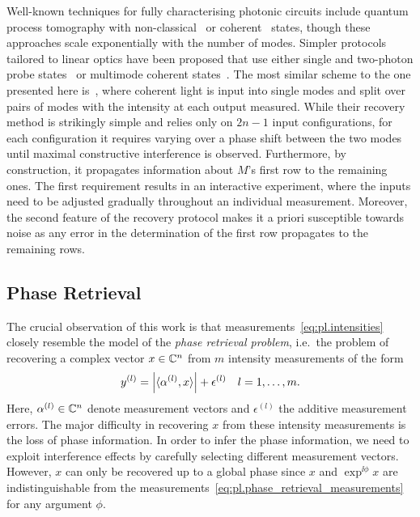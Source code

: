 Well-known techniques for fully characterising photonic circuits include quantum process tomography with non-classical~\cite{Brien_2004_Quantum} or coherent~\cite{Keshari_2011_Quantum} states, though these approaches scale exponentially with the number of modes.
Simpler protocols tailored to linear optics have been proposed that use either single and two-photon probe states~\cite{Laing_2012_SuperStable,Dhand_2016_Accurate,Spagnolo_2017_Learning} or multimode coherent states~\cite{Keshari_2013_Direct,Tillmann_2016_On}.
The most similar scheme to the one presented here is~\cite{Keshari_2013_Direct}, where coherent light is input into single modes and split over pairs of modes with the intensity at each output measured.
While their recovery method is strikingly simple and relies only on $2n-1$ input configurations, for each configuration it requires varying over a phase shift between the two modes until maximal constructive interference is observed.
Furthermore, by construction, it propagates information about ${M}$'s first row to the remaining ones.
The first requirement results in an interactive experiment, where the inputs need to be adjusted gradually throughout an individual measurement.
Moreover, the second feature of the recovery protocol makes it a priori susceptible towards noise as any error in the determination of the first row propagates to the remaining rows.



\subsection{Phase Retrieval}

The crucial observation of this work is that measurements~\eqref{eq:pl.intensities} closely resemble the model of the \textit{phase retrieval problem}, i.e.\ the problem of recovering a complex vector ${x} \in {\mathbb{C}}^n$ from $m$ intensity measurements of the form
\[
  y^{(l)}= {\left\vert\braket{\alpha^{(l)}, x}\right\vert} + \epsilon^{(l)}
  \quad l=1,\ldots,m.
  \label{eq:pl.phase_retrieval_measurements}
\]
Here, $\alpha^{(l)} \in {\mathbb{C}}^n$ denote measurement vectors and $\epsilon^{(l)}$ the additive measurement errors.
The major difficulty in recovering $x$ from these intensity measurements is the loss of phase information.
In order to infer the phase information, we need to exploit interference effects by carefully selecting different measurement vectors.
However, $x$ can only be recovered up to a global phase since $x$ and $\exp^{\ii\phi} x$ are indistinguishable from the measurements~\eqref{eq:pl.phase_retrieval_measurements} for any argument $\phi$.

